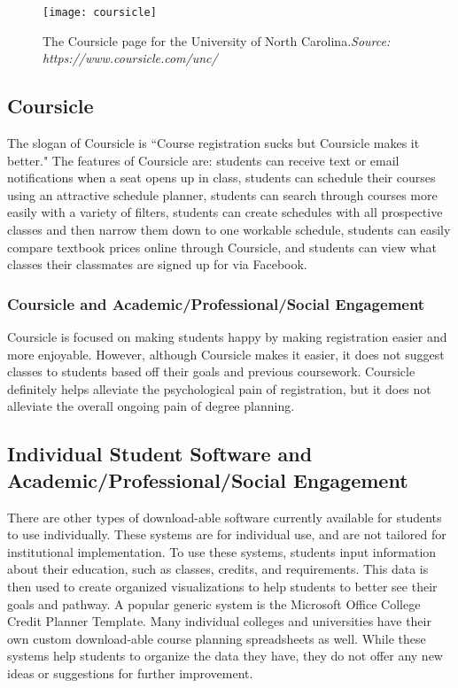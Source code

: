 \begin{figure}[h]
\centering
\texttt{[image: coursicle]}
\caption{The Coursicle page for the University of North Carolina.\textit{Source: https://www.coursicle.com/unc/}}
\end{figure}
\subsection{Coursicle}
The slogan of Coursicle is ``Course registration sucks but Coursicle makes it better." \cite{Coursicle} The features of Coursicle are: students can receive text or email notifications when a seat opens up in class, students can schedule their courses using an attractive schedule planner, students can search through courses more easily with a variety of filters, students can create schedules with all prospective classes and then narrow them down to one workable schedule, students can easily compare textbook prices online through Coursicle, and students can view what classes their classmates are signed up for via Facebook. 

\subsubsection{Coursicle and Academic/Professional/Social Engagement}
Coursicle is focused on making students happy by making registration easier and more enjoyable. However, although Coursicle makes it easier, it does not suggest classes to students based off their goals and previous coursework. Coursicle definitely helps alleviate the psychological pain of registration, but it does not alleviate the overall ongoing pain of degree planning. 

\subsection{Individual Student Software and Academic/Professional/Social Engagement}
There are other types of download-able software currently available for students to use individually. These systems are for individual use, and are not tailored for institutional implementation. To use these systems, students input information about their education, such as classes, credits, and requirements. This data is then used to create organized visualizations to help students to better see their goals and pathway. A popular generic system is the Microsoft Office College Credit Planner Template. Many individual colleges and universities have their own custom download-able course planning spreadsheets as well. While these systems help students to organize the data they have, they do not offer any new ideas or suggestions for further improvement.

